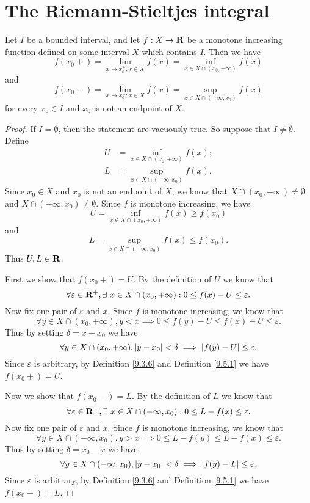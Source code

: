 \section{The Riemann-Stieltjes integral}\label{sec 11.8}

\begin{additional corollary}\label{ac 11.8.1}
Let \(I\) be a bounded interval, and let \(f : X \to \mathbf{R}\) be a monotone increasing function defined on some interval \(X\) which contains \(I\).
Then we have
\[
    f(x_0+) = \lim_{x \to x_0^+ ; x \in X} f(x) = \inf_{x \in X \cap (x_0, +\infty)} f(x)
\]
and
\[
    f(x_0-) = \lim_{x \to x_0^- ; x \in X} f(x) = \sup_{x \in X \cap (-\infty, x_0)} f(x)
\]
for every \(x_0 \in I\) and \(x_0\) is not an endpoint of \(X\).
\end{additional corollary}

\begin{proof}
    If \(I = \emptyset\), then the statement are vacuously true.
    So suppose that \(I \neq \emptyset\).
    Define
    \begin{align*}
        U & = \inf_{x \in X \cap (x_0, +\infty)} f(x); \\
        L & = \sup_{x \in X \cap (-\infty, x_0)} f(x).
    \end{align*}
    Since \(x_0 \in X\) and \(x_0\) is not an endpoint of \(X\), we know that \(X \cap (x_0, +\infty) \neq \emptyset\) and \(X \cap (-\infty, x_0) \neq \emptyset\).
    Since \(f\) is monotone increasing, we have
    \[
        U = \inf_{x \in X \cap (x_0, +\infty)} f(x) \geq f(x_0)
    \]
    and
    \[
        L = \sup_{x \in X \cap (-\infty, x_0)} f(x) \leq f(x_0).
    \]
    Thus \(U, L \in \mathbf{R}\).

    First we show that \(f(x_0+) = U\).
    By the definition of \(U\) we know that
    \[
        \forall \varepsilon \in \mathbf{R}^+, \exists\ x \in X \cap (x_0, +\infty) : 0 \leq f(x) - U \leq \varepsilon.
    \]
    Now fix one pair of \(\varepsilon\) and \(x\).
    Since \(f\) is monotone increasing, we know that
    \[
        \forall y \in X \cap (x_0, +\infty), y < x \implies 0 \leq f(y) - U \leq f(x) - U \leq \varepsilon.
    \]
    Thus by setting \(\delta = x - x_0\) we have
    \[
        \forall y \in X \cap (x_0, +\infty), \left\lvert y - x_0\right\rvert < \delta \implies \left\lvert f(y) - U\right\rvert \leq \varepsilon.
    \]
    Since \(\varepsilon\) is arbitrary, by Definition \ref{9.3.6} and Definition \ref{9.5.1} we have \(f(x_0+) = U\).

    Now we show that \(f(x_0-) = L\).
    By the definition of \(L\) we know that
    \[
        \forall \varepsilon \in \mathbf{R}^+, \exists\ x \in X \cap (-\infty, x_0) : 0 \leq L - f(x) \leq \varepsilon.
    \]
    Now fix one pair of \(\varepsilon\) and \(x\).
    Since \(f\) is monotone increasing, we know that
    \[
        \forall y \in X \cap (-\infty, x_0), y > x \implies 0 \leq L - f(y) \leq L - f(x) \leq \varepsilon.
    \]
    Thus by setting \(\delta = x_0 - x\) we have
    \[
        \forall y \in X \cap (-\infty, x_0), \left\lvert y - x_0\right\rvert < \delta \implies \left\lvert f(y) - L\right\rvert \leq \varepsilon.
    \]
    Since \(\varepsilon\) is arbitrary, by Definition \ref{9.3.6} and Definition \ref{9.5.1} we have \(f(x_0-) = L\).
\end{proof}

